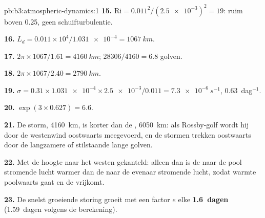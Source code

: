 \begin{solution}{pb:b3:atmospheric-dynamics:1}
\textbf{15.} $\mathrm{Ri} = 0.011^2/(\num{2.5e-3})^2 = 19$: ruim boven 0.25,
geen schuifturbulentie.

\textbf{16.} $L_d = 0.011\times10^4/\num{1.031e-4} = \qty{1067}{km}$.

\textbf{17.} $2\pi\times1067/1.61 = \qty{4160}{km}$; $28306/4160 = 6.8$
golven.

\textbf{18.} $2\pi\times1067/2.40 = \qty{2790}{km}$.

\textbf{19.} $\sigma = 0.31\times\num{1.031e-4}\times\num{2.5e-3}/0.011 =
\qty{7.3e-6}{s^{-1}}$, \num{0.63}~dag$^{-1}$.

\textbf{20.} $\exp(3\times0.627) = 6.6$.

\textbf{21.} De storm, \qty{4160}{km}, is korter dan de , \qty{6050}{km}: als Rossby-golf wordt hij door de westenwind
oostwaarts meegevoerd, en de stormen trekken oostwaarts door de langzamere of
stilstaande lange golven.

\textbf{22.} Met de hoogte naar het westen gekanteld: alleen dan is de naar de pool
stromende lucht warmer dan de naar de evenaar stromende lucht, zodat warmte
poolwaarts gaat en de  vrijkomt.

\textbf{23.} De snelst groeiende storing groeit met een factor $e$ elke
\textbf{\num[text-series-to-math=true]{1.6}~dagen} (\num{1.59}~dagen volgens de
berekening).
\end{solution}
